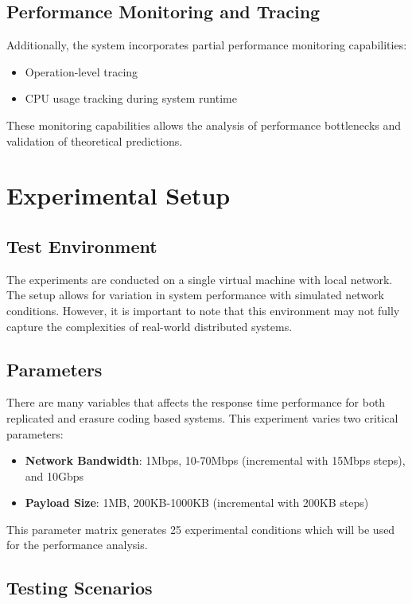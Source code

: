 \subsection{Performance Monitoring and Tracing}

Additionally, the system incorporates partial performance monitoring capabilities:
\begin{itemize}
\item Operation-level tracing
\item CPU usage tracking during system runtime
\end{itemize}

These monitoring capabilities allows the analysis of performance bottlenecks and validation of theoretical predictions.

\section{Experimental Setup}

\subsection{Test Environment}

The experiments are conducted on a single virtual machine with local network. The setup allows for variation in system performance with simulated network conditions. However, it is important to note that this environment may not fully capture the complexities of real-world distributed systems.

\subsection{Parameters}

There are many variables that affects the response time performance for both replicated and erasure coding based systems. This experiment varies two critical parameters:
\begin{itemize}
\item \textbf{Network Bandwidth}: 1Mbps, 10-70Mbps (incremental with 15Mbps steps), and 10Gbps
\item \textbf{Payload Size}: 1MB, 200KB-1000KB (incremental with 200KB steps)
\end{itemize}

This parameter matrix generates 25 experimental conditions which will be used for the performance analysis.

\subsection{Testing Scenarios}

